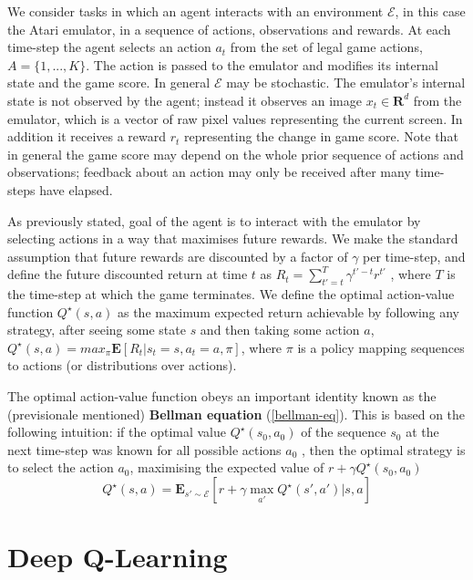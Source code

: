 \documentclass{article}
\begin{document}
We consider tasks in which an agent interacts with an environment $\mathcal{E}$, in this case the Atari emulator,
in a sequence of actions, observations and rewards. At each time-step the agent selects an action $a_{t}$ from the set of legal game actions, $A = \{1, . . . , K\}$. The action is passed to the emulator and
modifies its internal state and the game score. In general $\mathcal{E}$ may be stochastic. The emulator’s
internal state is not observed by the agent; instead it observes an image $x_t \in \mathbf{R}^d $ from the emulator,
which is a vector of raw pixel values representing the current screen. In addition it receives a reward
$r_t$ representing the change in game score. Note that in general the game score may depend on the
whole prior sequence of actions and observations; feedback about an action may only be received
after many time-steps have elapsed. %

As previously stated, goal of the agent is to interact with the emulator by selecting actions in a way that maximises
future rewards. We make the standard assumption that future rewards are discounted by a factor of $\gamma$ per time-step, and define the future discounted return at time $t$ as $R_t = \sum_{t'=t}^{T}\gamma^{t'-t}r^{t'}$ , where $T$
is the time-step at which the game terminates. We define the optimal action-value function $Q^\star(s, a)$ as the maximum expected return achievable by following any strategy, after seeing some state $s$ and then taking some action $a$, $Q^\star (s, a) = max_\pi \mathbf{E}[R_t |s_t = s, a_ t = a, \pi]$, where $\pi$ is a policy mapping sequences to actions (or distributions over actions).

The optimal action-value function obeys an important identity known as the (previsionale mentioned) \textbf{Bellman equation} (\ref{bellman-eq}). This is based on the following intuition: if the optimal value $Q^\star (s_0 , a_0 )$ of the sequence $s_0$ at the next
time-step was known for all possible actions $a_0$ , then the optimal strategy is to select the action $a_0$, maximising the expected value of $r + \gamma Q^\star (s_0, a_0)$
\begin{equation}
\label{bellman-eq}
	Q^\star (s,a) = \mathbf{E}_{s' \sim \mathcal{E}} [ r + \gamma \max_{a'} Q^\star(s', a') | s, a  ]
\end{equation}

\section{Deep Q-Learning}
\end{document}
